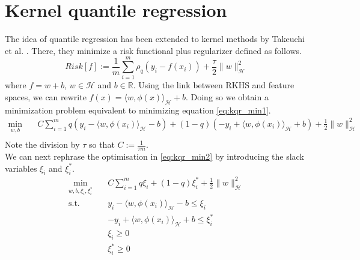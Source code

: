 \section{Kernel quantile regression}
The idea of quantile regression has been extended to kernel methods by Takeuchi et al. \cite{takeuchi2006nonparametric}.
There, they minimize a risk functional plus regularizer defined as follows.
\begin{equation}\label{eq:kqr_min1}
    Risk[f]:=\frac{1}{m}\sum\limits_{i=1}^{m}\rho_q(y_i-f(x_i))+\frac{\tau}{2}\|w\|_\mathcal{H}^2
\end{equation}
where $f=w+b$, $w \in \mathcal{H}$ and $b \in \mathbb{R}$.
Using the link between RKHS and feature spaces, we can rewrite $f(x)=\langle w, \phi(x) \rangle_{\mathcal{H}}+b$. 
 Doing so we obtain a minimization problem equivalent to minimizing equation \ref{eq:kqr_min1}.
\begin{equation}\label{eq:kqr_min2}
    \begin{aligned}
    \min_{w,b} \quad & C \sum \limits_{i=1}^{m}
    q(y_i-\langle w, \phi(x_i) \rangle_{\mathcal{H}}-b)+ (1-q)(-y_i+\langle w, \phi(x_i) \rangle_{\mathcal{H}}+b)+ \frac{1}{2}\|w\|_{\mathcal{H}}^2\\
    \end{aligned}
    \end{equation}
Note the division by $\tau$ so that $C:=\frac{1}{\tau m}$.
\\
We can next rephrase the optimisation in \ref{eq:kqr_min2} by introducing the slack variables $\xi_i$ and $\xi_i^*$.
\begin{equation}\label{eq:kqr_min3}
    \begin{aligned}
        \min_{w,b,\xi_i,\xi_i^*} \quad & C \sum \limits_{i=1}^{m}
        q \xi_i+ (1-q)\xi_i^*+ \frac{1}{2}\|w\|_{\mathcal{H}}^2\\
    \textrm{s.t.} \quad & y_i-\langle w, \phi(x_i) \rangle_{\mathcal{H}}-b \leq \xi_i\\
    & -y_i+\langle w, \phi(x_i) \rangle_{\mathcal{H}}+b \leq \xi_i^*\\
      &\xi_i\geq0    \\
      &\xi_i^*\geq0    \\
    \end{aligned}
    \end{equation}
